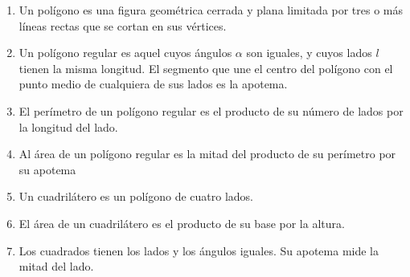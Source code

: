 \documentclass[10pt, a4paper,spanish]{article}
\begin{document}
		\begin{enumerate}[label=\alph*)]

			\item Un polígono es una figura geométrica cerrada y plana limitada por tres o más líneas rectas que se cortan en sus vértices.

			\item Un polígono regular es aquel cuyos ángulos $\alpha$ son iguales, y cuyos lados $l$ tienen la misma longitud. El segmento que une el centro del polígono con el punto medio de cualquiera de sus lados es la apotema.

			\item El perímetro de un polígono regular es el producto de su número de lados por la longitud del lado.

			\item Al área de un polígono regular es la mitad del producto de su perímetro por su apotema

			\item Un cuadrilátero es un polígono de cuatro lados.

			\item El área de un cuadrilátero es el producto de su base por la altura.

			\item Los cuadrados tienen los lados y los ángulos iguales. Su apotema mide la mitad del lado.

		\end{enumerate}


		\paragraph{}
\end{document}
